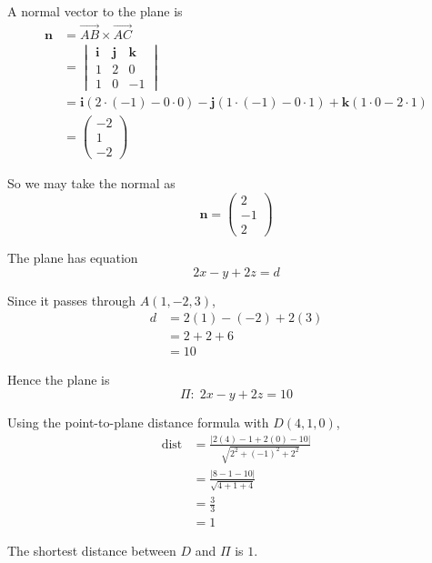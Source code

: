 \documentclass[leqno]{article}
\begin{document}
\begin{enumerate}[
  label=\textbf{\arabic*.},
  leftmargin=*,
  topsep=0pt,
  partopsep=0pt,
  parsep=0pt
]
\begin{tcolorbox}[colback=white, colframe=scarlet, title={\textbf{Solution}}, breakable, grow to left by=6mm, grow to right by=10mm]
\begin{enumerate}[label=\textbf{(\alph*)}]
A normal vector to the plane is
\begin{align*}
\mathbf n
&=\overrightarrow{AB}\times \overrightarrow{AC} \\
&=
\begin{vmatrix}
\mathbf i & \mathbf j & \mathbf k\\
1&2&0\\
1&0&-1
\end{vmatrix} \\
&=\mathbf i(2\cdot(-1)-0\cdot 0)-\mathbf j(1\cdot(-1)-0\cdot 1)+\mathbf k(1\cdot 0-2\cdot 1) \\
&=\begin{pmatrix}-2\\1\\-2\end{pmatrix}
\end{align*}

So we may take the normal as
\[
\mathbf n=\begin{pmatrix}2\\-1\\2\end{pmatrix}
\]

The plane has equation
\[
2x-y+2z=d
\]

Since it passes through \(A(1,-2,3)\),
\begin{align*}
d&=2(1)-(-2)+2(3)\\
&=2+2+6\\
&=10
\end{align*}

Hence the plane is
\[
\Pi:\;2x-y+2z=10
\]

Using the point-to-plane distance formula with \(D(4,1,0)\),
\begin{align*}
\mathrm{dist}
&=\frac{\left\lvert 2(4)-1+2(0)-10\right\rvert}{\sqrt{2^2+(-1)^2+2^2}} \\
&=\frac{\left\lvert 8-1-10\right\rvert}{\sqrt{4+1+4}} \\
&=\frac{3}{3} \\
&=1
\end{align*}

The shortest distance between \(D\) and \(\Pi\) is \(1\).


\end{enumerate}
\end{tcolorbox}
\end{enumerate}
\end{document}

